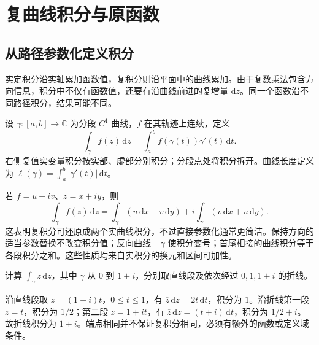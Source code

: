 \setcounter{chapter}{4} %
\chapter{复曲线积分与原函数}
\label{chap:ca-integral}

\section{从路径参数化定义积分}

实定积分沿实轴累加函数值，复积分则沿平面中的曲线累加。由于复数乘法包含方向信息，积分中不仅有函数值，还要有沿曲线前进的复增量 $\mathrm dz$。同一个函数沿不同路径积分，结果可能不同。

\begin{definition}[复曲线积分]
设 $\gamma:[a,b]\to\mathbb C$ 为分段 $C^1$ 曲线，$f$ 在其轨迹上连续，定义
\begin{equation}
 \int_\gamma f(z)\,\mathrm dz
 =\int_a^b f(\gamma(t))\gamma'(t)\,\mathrm dt.
 \label{eq:ca-path-integral}
\end{equation}
右侧复值实变量积分按实部、虚部分别积分；分段点处将积分拆开。曲线长度定义为 $\ell(\gamma)=\int_a^b|\gamma'(t)|\,\mathrm dt$。
\end{definition}

若 $f=u+iv$、$z=x+iy$，则
\[
 \int_\gamma f(z)\,\mathrm dz
 =\int_\gamma(u\,\mathrm dx-v\,\mathrm dy)
 +i\int_\gamma(v\,\mathrm dx+u\,\mathrm dy).
\]
这表明复积分可还原成两个实曲线积分，不过直接参数化通常更简洁。保持方向的适当参数替换不改变积分值；反向曲线 $-\gamma$ 使积分变号；首尾相接的曲线积分等于各段积分之和。这些性质均来自实积分的换元和区间可加性。

\begin{example}
计算 $\int_\gamma\overline z\,\mathrm dz$，其中 $\gamma$ 从 $0$ 到 $1+i$，分别取直线段及依次经过 $0,1,1+i$ 的折线。
\end{example}
\begin{solve}
沿直线段取 $z=(1+i)t$，$0\le t\le1$，有 $\overline z\,\mathrm dz=2t\,\mathrm dt$，积分为 $1$。沿折线第一段 $z=t$，积分为 $1/2$；第二段 $z=1+it$，有 $\overline z\,\mathrm dz=(t+i)\,\mathrm dt$，积分为 $1/2+i$。故折线积分为 $1+i$。端点相同并不保证复积分相同，必须有额外的函数或定义域条件。
\end{solve}

